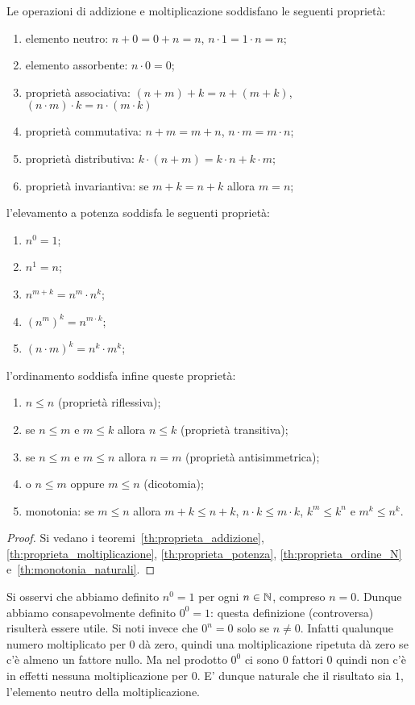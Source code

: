 \begin{theorem}[operazioni su $\NN$]
Le operazioni di addizione e moltiplicazione 
soddisfano le seguenti proprietà:
  \begin{enumerate}
    \item elemento neutro:
      $n + 0 = 0 + n = n$,
      $n\cdot 1 = 1\cdot n = n$;
    \item elemento assorbente:
      $n\cdot 0 = 0$;
    \item proprietà associativa: 
      $(n+m)+k = n+(m+k)$, $(n\cdot m)\cdot k = n \cdot (m\cdot k)$
    \item proprietà commutativa: 
      $n+m = m+n$, $n\cdot m = m\cdot n$;
    \item proprietà distributiva:
     $k\cdot (n+m) = k\cdot n + k\cdot m$;
    \item proprietà invariantiva:
     se $m+k = n+k$ allora $m=n$;
  \end{enumerate}
l'elevamento a potenza soddisfa le seguenti proprietà:
\begin{enumerate}
  \item $n^0 = 1$;
  \item $n^1 = n$;
  \item $n^{m+k} = n^m \cdot n^k$;
  \item $(n^m)^k = n^{m\cdot k}$;
  \item $(n\cdot m)^k = n^k \cdot m^k$;
\end{enumerate}
l'ordinamento soddisfa infine queste proprietà:
\begin{enumerate}
  \item $n\le n$ (proprietà riflessiva);
  \item se $n\le m$ e $m\le k$ allora $n\le k$ (proprietà transitiva);
  \item se $n\le m$ e $m\le n$ allora $n=m$ (proprietà antisimmetrica);
  \item o $n\le m$ oppure $m\le n$ (dicotomia);
  \item monotonia:
   se $m\le n$ allora 
   $m+k\le n+k$, $n\cdot k \le m\cdot k$,
   $k^m \le k^n$ e $m^k \le n^k$. 
\end{enumerate}
\end{theorem}
\begin{proof}
  Si vedano i teoremi~\ref{th:proprieta_addizione},
  \ref{th:proprieta_moltiplicazione},
  \ref{th:proprieta_potenza}, \ref{th:proprieta_ordine_N}
  e~\ref{th:monotonia_naturali}.
\end{proof}

Si osservi che abbiamo definito $n^0=1$ per ogni $n\in {\mathbb N}$,
compreso $n=0$. 
Dunque abbiamo consapevolmente definito $0^0=1$:
questa definizione (controversa) risulterà essere utile.
Si noti invece che $0^n=0$ solo se $n\neq 0$.
Infatti qualunque numero moltiplicato per $0$ dà zero, 
quindi una moltiplicazione ripetuta dà zero 
se c'è almeno un fattore nullo. 
Ma nel prodotto $0^0$ ci sono $0$ fattori $0$ quindi non c'è in effetti nessuna 
moltiplicazione per $0$. 
E' dunque naturale che il risultato sia $1$, 
l'elemento neutro della moltiplicazione.


